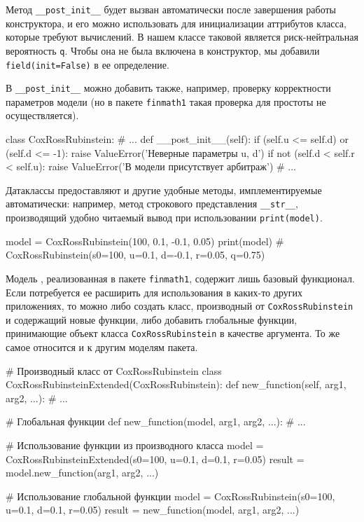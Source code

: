 Метод \verb"__post_init__" будет вызван автоматически после завершения работы конструктора, и его можно использовать для инициализации аттрибутов класса, которые требуют вычислений.
В нашем классе таковой является риск-нейтральная вероятность \verb"q".
Чтобы она не была включена в конструктор, мы добавили \verb"field(init=False)" в ее определение.

В \verb"__post_init__" можно добавить также, например, проверку корректности параметров модели (но в пакете \verb"finmath1" такая проверка для простоты не осуществляется).
\begin{python}
class CoxRossRubinstein:
    # ...
    def __post_init__(self):
        if (self.u <= self.d) or (self.d <= -1):
            raise ValueError('Неверные параметры u, d')
        if not (self.d < self.r < self.u):
            raise ValueError('В модели присутствует арбитраж')
        # ...
\end{python}

Датаклассы предоставляют и другие удобные методы, имплементируемые автоматически: например, метод строкового представления \verb"__str__", производящий удобно читаемый вывод при использовании \verb"print(model)". 
\begin{python}
model = CoxRossRubinstein(100, 0.1, -0.1, 0.05)
print(model)  # CoxRossRubinstein(s0=100, u=0.1, d=-0.1, r=0.05, q=0.75)
\end{python}

\begin{remark}
Модель \crr, реализованная в пакете \verb"finmath1", содержит лишь базовый функционал.
Если потребуется ее расширить для использования в каких-то других приложениях, то можно либо создать класс, производный от \verb"CoxRossRubinstein" и содержащий новые функции, либо добавить глобальные функции, принимающие объект класса \verb"CoxRossRubinstein" в качестве аргумента.
То же самое относится и к другим моделям пакета. 
\begin{python}
# Производный класс от CoxRossRubinstein
class CoxRossRubinsteinExtended(CoxRossRubinstein):
    def new_function(self, arg1, arg2, ...):
    # ...

# Глобальная функции
def new_function(model, arg1, arg2, ...):
    # ...

# Использование функции из производного класса
model = CoxRossRubinsteinExtended(s0=100, u=0.1, d=0.1, r=0.05)
result = model.new_function(arg1, arg2, ...)

# Использование глобальной функции
model = CoxRossRubinstein(s0=100, u=0.1, d=0.1, r=0.05)
result = new_function(model, arg1, arg2, ...)
\end{python}
\end{remark}


